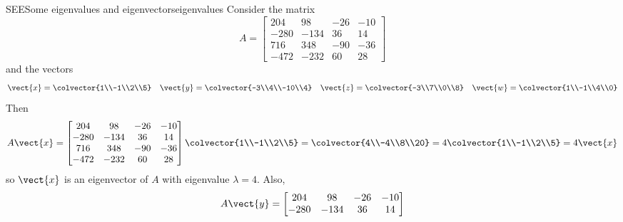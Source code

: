 \begin{example}{SEE}{Some eigenvalues and eigenvectors}{eigenvalues}
Consider the matrix
%
\begin{equation*}
A=
\begin{bmatrix}
204 & 98 & -26 & -10\\
-280 & -134 & 36 & 14\\
716 & 348 & -90 & -36\\
-472 & -232 & 60 & 28
\end{bmatrix}
\end{equation*}
%
and the vectors
%
\begin{align*}
\vect{x}=\colvector{1\\-1\\2\\5}&&     %
\vect{y}=\colvector{-3\\4\\-10\\4}&&  %
\vect{z}=\colvector{-3\\7\\0\\8}&&     %
\vect{w}=\colvector{1\\-1\\4\\0}        %
\end{align*}
%
Then
%
\begin{equation*}
A\vect{x}=
\begin{bmatrix}
204 & 98 & -26 & -10\\
-280 & -134 & 36 & 14\\
716 & 348 & -90 & -36\\
-472 & -232 & 60 & 28
\end{bmatrix}
\colvector{1\\-1\\2\\5}=
\colvector{4\\-4\\8\\20}=
4\colvector{1\\-1\\2\\5}=4\vect{x}
%
\end{equation*}
%
so $\vect{x}$ is an eigenvector of $A$ with eigenvalue $\lambda=4$.  Also,
%
\begin{equation*}
A\vect{y}=
\begin{bmatrix}
204 & 98 & -26 & -10\\
-280 & -134 & 36 & 14\\

\end{bmatrix}
\end{equation*}
\end{example}
